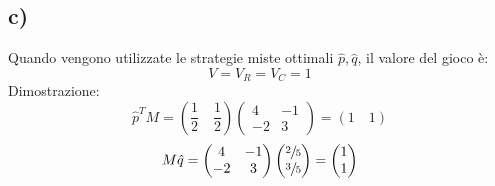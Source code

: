 \documentclass[12pt]{article}
\begin{document}
\subsection*{c)}
Quando vengono utilizzate le strategie miste ottimali $\hat{p},\hat{q}$, il valore del gioco è:
\begin{equation*}
        V = V_{R} = V_{C} = 1
\end{equation*}
Dimostrazione:
\begin{equation*}
    \hat{p}^{T}M = \left(\frac{1}{2}\quad\frac{1}{2}\right) \begin{pmatrix}
        4 & -1 \\
        -2 & 3
    \end{pmatrix}
    = \left(1 \quad 1\right)
\end{equation*}
\begin{equation*}
    M\hat{q} = \begin{pmatrix}
        4 & -1 \\
        -2 & 3
    \end{pmatrix}\begin{pmatrix}
        \sfrac{2}{5} \\
        \sfrac{3}{5}
    \end{pmatrix} = \begin{pmatrix}
        1 \\
        1
    \end{pmatrix}
\end{equation*}
\end{document}
